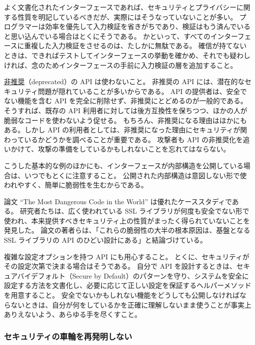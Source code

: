 \documentclass[uplatex]{jsarticle}
\def\label#1{}%
\begin{document}
よく文書化されたインターフェースであれば、セキュリティとプライバシーに関する性質を明記しているべきだが、実際にはそうなっていないことが多い。
プログラマーは効率を優先して入力検証を省きがちであり、検証はもう済んでいると思い込んでいる場合はとくにそうである。
かといって、すべてのインターフェースに重複した入力検証をさせるのは、たしかに無駄である。
確信が持てないときは、できればテストしてインターフェースの挙動を確かめ、それでも疑わしければ、念のためインターフェースの手前に入力検証の層を追加すること。

\underline{非推奨}（deprecated）の API は使わないこと。
非推奨の API には、潜在的なセキュリティ問題が隠れていることが多いからである。
API の提供者は、安全でない機能を含む API を完全に削除せず、非推奨にとどめるのが一般的である。
そうすれば、既存の API 利用者に対しては後方互換性を保ちつつ、ほかの人が脆弱なコードを使わないよう促せる。
もちろん、非推奨になる理由はほかにもある。しかし API の利用者としては、非推奨になった理由にセキュリティが関わっているかどうかを調べることが重要である。
攻撃者も API の非推奨化を追いかけて、攻撃の準備をしているかもしれないことを忘れてはならない。

こうした基本的な例のほかにも、インターフェースが内部構造を公開している場合は、いつでもとくに注意すること。
公開された内部構造は意図しない形で使われやすく、簡単に脆弱性を生むからである。

\begin{exa}\label{exa:ch13-most-dangerous-code}
論文 ``The Most Dangerous Code in the World'' は優れたケーススタディである。
研究者たちは、広く使われている SSL ライブラリが何度も安全でない形で使われ、本来提供すべきセキュリティ上の性質がまったく得られていないことを発見した。
論文の著者らは、「これらの脆弱性の大半の根本原因は、基盤となる SSL ライブラリの API のひどい設計にある」と結論づけている。
\end{exa}

複雑な設定オプションを持つ API にも用心すること。
とくに、セキュリティがその設定次第で決まる場合はそうである。
自分で API を設計するときは、セキュアバイデフォルト（Secure by Default）のパターンを守り、システムを安全に設定する方法を文書化し、必要に応じて正しい設定を保証するヘルパーメソッドを用意すること。
安全でないかもしれない機能をどうしても公開しなければならないときは、自分が何をしているかを正確に理解しないまま使うことが事実上ありえないよう、あらゆる手を尽くすこと。

\subsubsection{セキュリティの車輪を再発明しない}
\end{document}
